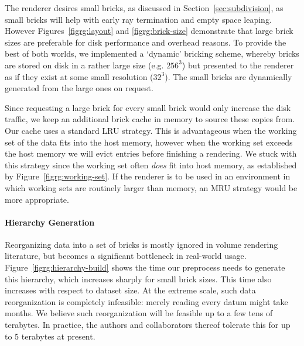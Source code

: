 
The renderer desires small bricks, as discussed in
Section~\ref{sec:subdivision}, as small bricks will help with early ray
termination and empty space leaping.  However
Figures~\ref{figrg:layout}
and \ref{figrg:brick-size} demonstrate that large brick sizes are
preferable for disk performance and overhead reasons.  To provide
the best of both worlds, we implemented a `dynamic' bricking scheme,
whereby bricks are stored on disk in a rather large size (e.g. $256^3$)
but presented to the renderer as if they exist at some small resolution
($32^3$).  The small bricks are dynamically generated from the large
ones on request.

Since requesting a large brick for every small brick would only
increase the disk traffic, we keep an additional brick cache in memory
to source these copies from.  Our cache uses a standard LRU strategy.
This is advantageous when the working set of the data fits into the
host memory, however when the working set exceeds the host memory we
will evict entries before finishing a rendering.  We stuck with this
strategy since the working set
often \emph{does} fit into host memory, as established by
Figure~\ref{figrg:working-set}.  If the renderer is to be used in an
environment in which working sets are routinely larger than memory, an
MRU strategy would be more appropriate.

\paragraph{Hierarchy Generation}

Reorganizing data into a set of bricks is mostly ignored in volume
rendering literature, but becomes a significant bottleneck in
real-world usage.
Figure~\ref{figrg:hierarchy-build} shows the time our preprocess needs
to generate this hierarchy, which increases sharply for small brick
sizes.  This time also increases with respect to dataset size.  At
the extreme scale, such data reorganization is completely infeasible:
merely reading every datum might take months.  We believe such
reorganization will be feasible up to a few tens of terabytes.  In
practice, the authors and collaborators thereof tolerate this for up to
5 terabytes at present.


